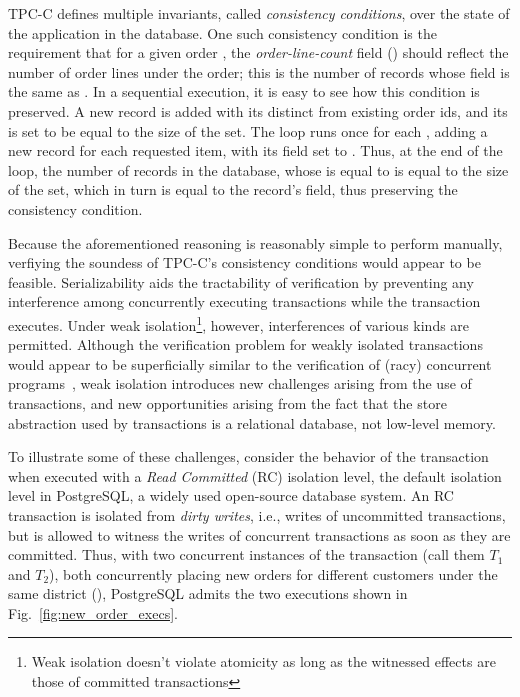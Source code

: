 TPC-C defines multiple invariants, called \emph{consistency
  conditions}, over the state of the application in the database. One
such consistency condition is the requirement that for a given order
, the \emph{order-line-count} field () should
reflect the number of order lines under the order; this is the number
of  records whose  field is the same as
.  In a sequential execution, it is easy to see how this
condition is preserved.  A new  record is added with its
 distinct from existing order ids, and its  is
set to be equal to the size of the  set. The 
loop runs once for each , adding a new 
record for each requested item, with its  field set to
. Thus, at the end of the loop, the number of 
records in the database, whose  is equal to  is
equal to the size of the  set, which in turn is equal to
the  record's  field, thus preserving the
consistency condition.

Because the aforementioned reasoning is reasonably simple to perform
manually, verfiying the soundess of TPC-C's consistency conditions
would appear to be feasible.  Serializability aids the tractability of
verification by preventing any interference among concurrently
executing transactions while the  transaction executes.
Under weak isolation\footnote{Weak isolation doesn't violate atomicity
  as long as the witnessed effects are those of committed
  transactions}, however, interferences of various kinds are
permitted.  Although the verification problem for weakly isolated
transactions would appear to be superficially similar to the
verification of (racy) concurrent programs~\cite{concurrentGC...},
weak isolation introduces new challenges arising from the use of
transactions, and new opportunities arising from the fact that the
store abstraction used by transactions is a relational database, not
low-level memory.  

To illustrate some of these challenges, consider the behavior of the
 transaction when executed with a \emph{Read Committed}
(RC) isolation level, the default isolation level in PostgreSQL, a
widely used open-source database system.  An RC transaction is
isolated from \emph{dirty writes}, i.e., writes of uncommitted
transactions, but is allowed to witness the writes of concurrent
transactions as soon as they are committed. Thus, with two concurrent
instances of the  transaction (call them $T_1$ and
$T_2$), both concurrently placing new orders for different customers
under the same district (), PostgreSQL admits the two
executions shown in Fig.~\ref{fig:new_order_execs}.

